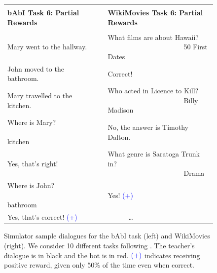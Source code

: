 \newcommand{\PLUS}{{\textcolor{blue}{(+)}}}
\newcommand{\SPACE}{~~~~~~~~~~~~~~~~~~~~~~}
\begin{figure}[h]
\begin{small}
\begin{tabular}{|l|c|l|}
\cline{1-1}\cline{3-3}
&& \\[-2ex]
{\bf bAbI Task 6: Partial Rewards} &&
{\bf WikiMovies Task 6: Partial Rewards}  \\
&& \\[-2ex]
Mary went to the hallway.         &&
What films are about Hawaii? \SPACE \textcolor{dred}{50 First Dates}\\
John moved to the bathroom.    &&
Correct! \\  %
Mary travelled to the kitchen.     &&
Who acted in Licence to Kill? \SPACE \textcolor{dred}{Billy Madison}\\
Where is Mary? \SPACE~ \textcolor{dred}{kitchen} &&
No, the answer is Timothy Dalton.\\
Yes, that's right! &&
What genre is Saratoga Trunk in?  \SPACE    \textcolor{dred}{Drama}\\
Where is John? \SPACE~~ \textcolor{dred}{bathroom}  &&
Yes! \PLUS \\
Yes, that's correct!  \PLUS   &&  ~~~~~~\dots  \\
\cline{1-1}\cline{3-3}
\end{tabular}
\end{small}
\caption[Simulator sample dialogues for the bAbI task and WikiMovies.]{Simulator sample dialogues for the bAbI task (left) and WikiMovies (right).
We consider 10 different tasks following \cite{weston2016dialog}.
The teacher's dialogue is in black and the bot is in red.
$\PLUS$ indicates receiving positive reward, given only 50\% of the time even when correct.
\label{fig:simulator-examples}
}
\end{figure}




